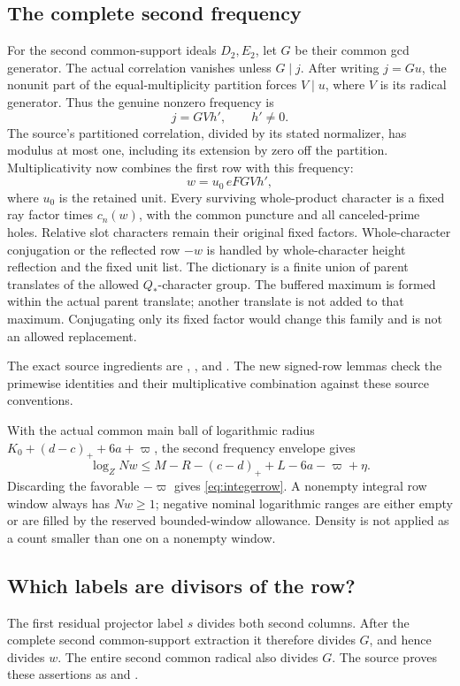 \subsection{The complete second frequency}
For the second common-support ideals $D_2,E_2$, let $G$ be their common
gcd generator. The actual correlation vanishes unless $G\mid j$.
After writing $j=Gu$, the nonunit part of the equal-multiplicity
partition forces $V\mid u$, where $V$ is its radical generator.
Thus the genuine nonzero frequency is
\[
 j=GVh',\qquad h'\ne0.
\]
The source's partitioned correlation, divided by its stated normalizer,
has modulus at most one, including its extension by zero off the
partition. Multiplicativity now combines the first row with this frequency:
\[
 w=u_0\,eFGVh',
\]
where $u_0$ is the retained unit. Every surviving whole-product character
is a fixed ray factor times $c_n(w)$, with the common puncture and all
canceled-prime holes. Relative slot characters remain their original
fixed factors. Whole-character conjugation or the reflected row $-w$
is handled by whole-character height reflection and the fixed unit
list. The dictionary is a finite union of parent translates of the
allowed $Q_*$-character group. The buffered maximum is formed within
the actual parent translate; another translate is not added to that
maximum. Conjugating only its fixed factor would change this family
and is not an allowed replacement.

The exact source ingredients are
,
, and
.
The new signed-row lemmas check the primewise identities and their
multiplicative combination against these source conventions.

With the actual common main ball of logarithmic radius
$K_0+(d-c)_++6a+\varpi$, the second frequency envelope gives
\[
 \log_Z Nw\le M-R-(c-d)_++L-6a-\varpi+\eta.
\]
Discarding the favorable $-\varpi$ gives \eqref{eq:integerrow}.
A nonempty integral row window always has $Nw\ge1$; negative nominal
logarithmic ranges are either empty or are filled by the reserved
bounded-window allowance. Density is not applied as a count smaller
than one on a nonempty window.

\subsection{Which labels are divisors of the row?}
The first residual projector label $s$ divides both second columns.
After the complete second common-support extraction it therefore divides
$G$, and hence divides $w$. The entire second common radical also divides
$G$. The source proves these assertions as
 and
.

